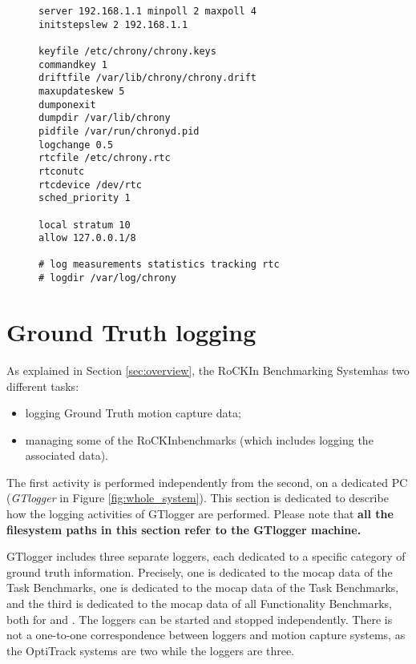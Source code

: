 \documentclass[a4paper]{article}
\newcommand{\ro}{RoCKIn}
\newcommand{\rbs}{RoCKIn Benchmarking System}
\begin{document}
\begin{figure}[h!]
\label{lst:chrony}
	\noindent
	\begin{minipage}[t!]{\linewidth}
		\begin{lstlisting}[caption=chrony.conf]
server 192.168.1.1 minpoll 2 maxpoll 4
initstepslew 2 192.168.1.1

keyfile /etc/chrony/chrony.keys
commandkey 1
driftfile /var/lib/chrony/chrony.drift
maxupdateskew 5
dumponexit
dumpdir /var/lib/chrony
pidfile /var/run/chronyd.pid
logchange 0.5
rtcfile /etc/chrony.rtc
rtconutc
rtcdevice /dev/rtc 
sched_priority 1   

local stratum 10
allow 127.0.0.1/8

# log measurements statistics tracking rtc
# logdir /var/log/chrony
		\end{lstlisting}
	\end{minipage}
\end{figure}

\clearpage


\section{Ground Truth logging}
\label{sec:operating}

As explained in Section \ref{sec:overview}, the \rbs has two different tasks:
\begin{itemize}
\item logging Ground Truth motion capture data;
\item managing some of the \ro benchmarks (which includes logging the associated data).
\end{itemize}

The first activity is performed independently from the second, on a dedicated PC (\textit{GTlogger} in Figure \ref{fig:whole_system}). This section is dedicated to describe how the logging activities of GTlogger are performed. Please note that \textbf{all the filesystem paths in this section refer to the GTlogger machine.}

GTlogger includes three separate loggers, each dedicated to a specific category of ground truth information. Precisely, one is dedicated to the mocap data of the \ro@Home Task Benchmarks, one is dedicated to the mocap data of the \ro@Work Task Benchmarks, and the third is dedicated to the mocap data of all Functionality Benchmarks, both for \ro@Home and \ro@Work. The loggers can be started and stopped independently. There is not a one-to-one correspondence between loggers and motion capture systems, as the OptiTrack systems are two while the loggers are three. 
\end{document}
